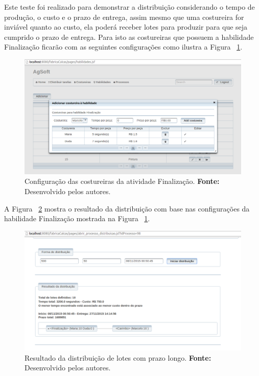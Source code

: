 \par Este teste foi realizado para demonstrar a distribuição considerando o tempo de
produção, o custo e o prazo de entrega, assim mesmo que uma costureira for inviável 
quanto ao custo, ela poderá receber lotes para produzir para que seja cumprido o prazo 
de entrega. Para isto as costureiras que possuem a habilidade Finalização ficarão com
as seguintes configurações como ilustra a Figura
~\ref{fig:configuracao_habilidade_costureira_teste3}.

\newpage

\begin{figure}[h!]
	\centerline{\includegraphics[scale=0.3]{./imagens/cofiguracao_habilidade_teste3.png}}
	\caption[Configuração das costureiras da atividade Finalização.]
	{Configuração das costureiras da atividade Finalização. \textbf{Fonte:}
	Desenvolvido pelos autores.}
	\label{fig:configuracao_habilidade_costureira_teste3}
\end{figure}


\par A Figura ~\ref{fig:resultado1_teste3} mostra o resultado da distribuição
com base nas configurações da habilidade Finalização mostrada na Figura
~\ref{fig:configuracao_habilidade_costureira_teste3}.

\begin{figure}[h!]
	\centerline{\includegraphics[scale=0.3]{./imagens/resultado1_teste3.png}}
	\caption[Resultado da distribuição de lotes com prazo longo.]
	{Resultado da distribuição de lotes com prazo longo. \textbf{Fonte:} Desenvolvido pelos
	autores.}
	\label{fig:resultado1_teste3}
\end{figure}

